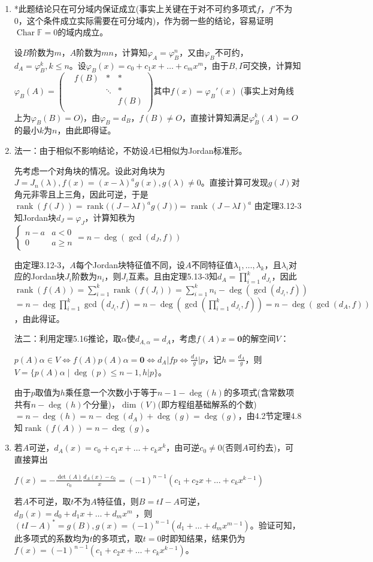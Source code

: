 \documentclass[a4paper,UTF8,fontset=windows]{ctexart}
\DeclareMathOperator{\Char}{Char}
\DeclareMathOperator{\rank}{rank}
\begin{document}
\begin{enumerate}
\item
*此题结论只在可分域内保证成立(事实上关键在于对不可约多项式$f$，$f'$不为0，这个条件成立实际需要在可分域内)，作为弱一些的结论，容易证明$\Char\mathbb{F}=0$的域内成立。

设$B$阶数为$m$，$A$阶数为$mn$，计算知$\varphi_A=\varphi_B^n$，又由$\varphi_B$不可约，$d_A=\varphi_B^k,k\le n$。设$\varphi_B(x)=c_0+c_1x+\dots+c_mx^m$，由于$B,I$可交换，计算知$\varphi_B(A)=\begin{pmatrix}&f(B)&\ast&\ast\\&&\ddots&\ast\\&&&f(B)\\&&&\end{pmatrix}$其中$f(x)=\varphi_B'(x)$ (事实上对角线上为$\varphi_B(B)=O$)，由$\varphi_B=d_B$，$f(B)\ne O$，直接计算知满足$\varphi_B^k(A)=O$的最小$k$为$n$，由此即得证。

\item
法一：由于相似不影响结论，不妨设$A$已相似为Jordan标准形。

先考虑一个对角块的情况。设此对角块为$J=J_n(\lambda),f(x)=(x-\lambda)^ag(x),g(\lambda)\ne0$。直接计算可发现$g(J)$对角元非零且上三角，因此可逆，于是$\rank(f(J))=\rank\big((J-\lambda I)^ag(J)\big)=\rank(J-\lambda I)^a$
由定理3.12-3知Jordan块$d_J=\varphi_J$，计算知秩为$\begin{cases}n-a&a<0\\0&a\ge n\end{cases}=n-\deg(\gcd(d_J,f))$

由定理3.12-3，$A$每个Jordan块特征值不同，设$A$不同特征值$\lambda_1,\dots,\lambda_k$，且$\lambda_i$对应的Jordan块$J_i$阶数为$n_i$，则$J_i$互素。且由定理5.13-3知$d_A=\prod_{i=1}^kd_{J_i}$，因此$\rank(f(A))=\sum_{i=1}^k\rank(f(J_i))=\sum_{i=1}^kn_i-\deg(\gcd(d_{J_i},f))$
$=n-\deg\prod_{i=1}^{k}\gcd\left(d_{J_i},f\right)=n-\deg\left(\gcd\left(\prod_{i=1}^{k}d_{J_i},f\right)\right)=n-\deg(\gcd(d_A,f))$，由此得证。

法二：利用定理5.16推论，取$\alpha$使$d_{A,\alpha}=d_A$，考虑$f(A)x=\mathbf{0}$的解空间$V$：

$p(A)\alpha\in V\Leftrightarrow f(A)p(A)\alpha=\mathbf{0}\Leftrightarrow d_A|fp\Leftrightarrow \frac{d_A}{g}\bigg|p$，记$h=\frac{d_A}{g}$，则$V=\{p(A)\alpha\mid\deg(p)\le n-1,h|p\}$。

由于$p$取值为$h$乘任意一个次数小于等于$n-1-\deg(h)$的多项式(含常数项共有$n-\deg(h)$个分量)，$\dim(V)$(即方程组基础解系的个数)$=n-\deg(h)=n-\deg(d_A)+\deg(g)=\deg(g)$，由4.2节定理4.8知$\rank(f(A))=n-\deg(g)$。

\item
若$A$可逆，$d_A(x)=c_0+c_1x+\dots+c_kx^k$，由可逆$c_0\ne0$(否则$A$可约去)，可直接算出

$f(x)=-\frac{\det(A)}{c_0}\frac{d_A(x)-c_0}{x}=(-1)^{n-1}(c_1+c_2x+\dots+c_kx^{k-1})$

若$A$不可逆，取$t$不为$A$特征值，则$B=tI-A$可逆，$d_B(x)=d_0+d_1x+\dots+d_mx^m$ ，则$(tI-A)^\ast=g(B),g(x)=(-1)^{n-1}(d_1+\dots+d_mx^{m-1})$。验证可知，此多项式的系数均为$t$的多项式，取$t=0$时即知结果，结果仍为$f(x)=(-1)^{n-1}(c_1+c_2x+\dots+c_kx^{k-1})$。
\end{enumerate}
\end{document}
